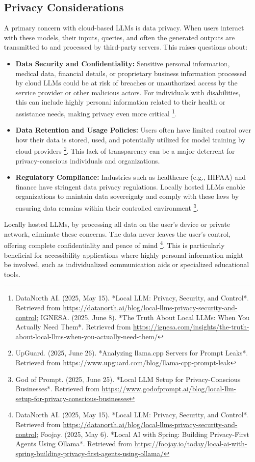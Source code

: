 \subsection{Privacy Considerations}
A primary concern with cloud-based LLMs is data privacy. When users interact with these models, their inputs, queries, and often the generated outputs are transmitted to and processed by third-party servers. This raises questions about:
\begin{itemize}
    \item \textbf{Data Security and Confidentiality:} Sensitive personal information, medical data, financial details, or proprietary business information processed by cloud LLMs could be at risk of breaches or unauthorized access by the service provider or other malicious actors. For individuals with disabilities, this can include highly personal information related to their health or assistance needs, making privacy even more critical \footnote{DataNorth AI. (2025, May 15). *Local LLM: Privacy, Security, and Control*. Retrieved from \url{https://datanorth.ai/blog/local-llms-privacy-security-and-control}; IGNESA. (2025, June 8). *The Truth About Local LLMs: When You Actually Need Them*. Retrieved from \url{https://ignesa.com/insights/the-truth-about-local-llms-when-you-actually-need-them/}}.
    \item \textbf{Data Retention and Usage Policies:} Users often have limited control over how their data is stored, used, and potentially utilized for model training by cloud providers \footnote{UpGuard. (2025, June 26). *Analyzing llama.cpp Servers for Prompt Leaks*. Retrieved from \url{https://www.upguard.com/blog/llama-cpp-prompt-leak}}. This lack of transparency can be a major deterrent for privacy-conscious individuals and organizations.
    \item \textbf{Regulatory Compliance:} Industries such as healthcare (e.g., HIPAA) and finance have stringent data privacy regulations. Locally hosted LLMs enable organizations to maintain data sovereignty and comply with these laws by ensuring data remains within their controlled environment \footnote{God of Prompt. (2025, June 25). *Local LLM Setup for Privacy-Conscious Businesses*. Retrieved from \url{https://www.godofprompt.ai/blog/local-llm-setup-for-privacy-conscious-businesses}}.
\end{itemize}
Locally hosted LLMs, by processing all data on the user's device or private network, eliminate these concerns. The data never leaves the user's control, offering complete confidentiality and peace of mind \footnote{DataNorth AI. (2025, May 15). *Local LLM: Privacy, Security, and Control*. Retrieved from \url{https://datanorth.ai/blog/local-llms-privacy-security-and-control}; Foojay. (2025, May 6). *Local AI with Spring: Building Privacy-First Agents Using Ollama*. Retrieved from \url{https://foojay.io/today/local-ai-with-spring-building-privacy-first-agents-using-ollama/}}. This is particularly beneficial for accessibility applications where highly personal information might be involved, such as individualized communication aids or specialized educational tools.

